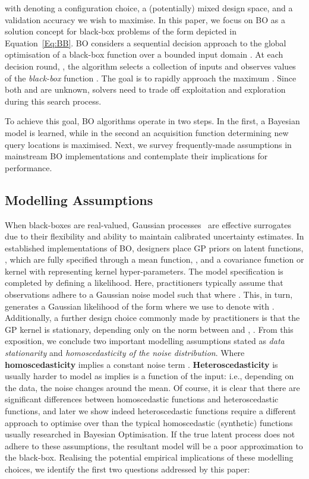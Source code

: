\documentclass[jair,twoside,11pt,theapa]{article}
\let\cite\shortcite
\theoremstyle{definition}
\begin{document}
with  denoting a configuration choice,  a (potentially) mixed design space, and  a validation accuracy we wish to maximise. In this paper, we focus on BO as a solution concept for black-box problems of the form depicted in Equation~\ref{Eq:BB}. BO considers a sequential decision approach to the global optimisation of a black-box function  over a bounded input domain . At each decision round, , the algorithm selects a collection of  inputs  and observes values of the \emph{black-box} function . The goal is to rapidly approach the maximum . Since both  and  are unknown, solvers need to trade off exploitation and exploration during this search process. 

To achieve this goal, BO algorithms operate in two steps. In the first, a Bayesian model is learned, while in the second an acquisition function determining new query locations is maximised. Next, we survey frequently-made assumptions in mainstream BO implementations and contemplate their implications for performance.

\subsection{Modelling Assumptions} 
When black-boxes are real-valued, Gaussian processes~\cite{2006_Williams} are effective surrogates due to their flexibility and ability to maintain calibrated uncertainty estimates. In established implementations of BO, designers place GP priors on latent functions, , which are fully specified through a mean function, , and a covariance function or kernel  with  representing kernel hyper-parameters. The model specification is completed by defining a likelihood. Here, practitioners typically assume that observations  adhere to a Gaussian noise model such that  where . This, in turn, generates a Gaussian likelihood of the form  where we use  to denote  with . Additionally, a further design choice commonly made by practitioners is that the GP kernel is stationary, depending only on the norm between  and , . From this exposition, we conclude two important modelling assumptions stated as \emph{data stationarity} and \emph{homoscedasticity of the noise distribution}. Where \textbf{homoscedasticity} implies a constant noise term . \textbf{Heteroscedasticity} is usually harder to model as implies  is a function of the input: i.e., depending on the data, the noise changes around the mean. Of course, it is clear that there are significant differences between homoscedastic functions and heteroscedastic functions, and later we show indeed heteroscedastic functions require a different approach to optimise over than the typical homoscedastic (synthetic) functions usually researched in Bayesian Optimisation. If the true latent process does not adhere to these assumptions, the resultant model will be a poor approximation to the black-box. Realising the potential empirical implications of these modelling choices, we identify the first two questions addressed by this paper: \\
\end{document}
